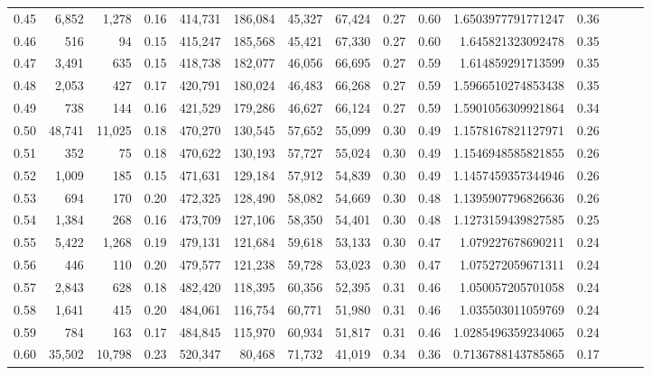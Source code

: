\begin{tabular}{rrrrrrrrrrrrrrr}
0.45 &   6,852 &   1,278 &  0.16 &  414,731 &  186,084 &   45,327 &   67,424 &  0.27 &  0.60 &    1.6503977791771247 &      0.36 \\
0.46 &     516 &      94 &  0.15 &  415,247 &  185,568 &   45,421 &   67,330 &  0.27 &  0.60 &     1.645821323092478 &      0.35 \\
0.47 &   3,491 &     635 &  0.15 &  418,738 &  182,077 &   46,056 &   66,695 &  0.27 &  0.59 &     1.614859291713599 &      0.35 \\
0.48 &   2,053 &     427 &  0.17 &  420,791 &  180,024 &   46,483 &   66,268 &  0.27 &  0.59 &    1.5966510274853438 &      0.35 \\
0.49 &     738 &     144 &  0.16 &  421,529 &  179,286 &   46,627 &   66,124 &  0.27 &  0.59 &    1.5901056309921864 &      0.34 \\
0.50 &  48,741 &  11,025 &  0.18 &  470,270 &  130,545 &   57,652 &   55,099 &  0.30 &  0.49 &    1.1578167821127971 &      0.26 \\
0.51 &     352 &      75 &  0.18 &  470,622 &  130,193 &   57,727 &   55,024 &  0.30 &  0.49 &    1.1546948585821855 &      0.26 \\
0.52 &   1,009 &     185 &  0.15 &  471,631 &  129,184 &   57,912 &   54,839 &  0.30 &  0.49 &    1.1457459357344946 &      0.26 \\
0.53 &     694 &     170 &  0.20 &  472,325 &  128,490 &   58,082 &   54,669 &  0.30 &  0.48 &    1.1395907796826636 &      0.26 \\
0.54 &   1,384 &     268 &  0.16 &  473,709 &  127,106 &   58,350 &   54,401 &  0.30 &  0.48 &    1.1273159439827585 &      0.25 \\
0.55 &   5,422 &   1,268 &  0.19 &  479,131 &  121,684 &   59,618 &   53,133 &  0.30 &  0.47 &     1.079227678690211 &      0.24 \\
0.56 &     446 &     110 &  0.20 &  479,577 &  121,238 &   59,728 &   53,023 &  0.30 &  0.47 &     1.075272059671311 &      0.24 \\
0.57 &   2,843 &     628 &  0.18 &  482,420 &  118,395 &   60,356 &   52,395 &  0.31 &  0.46 &     1.050057205701058 &      0.24 \\
0.58 &   1,641 &     415 &  0.20 &  484,061 &  116,754 &   60,771 &   51,980 &  0.31 &  0.46 &     1.035503011059769 &      0.24 \\
0.59 &     784 &     163 &  0.17 &  484,845 &  115,970 &   60,934 &   51,817 &  0.31 &  0.46 &    1.0285496359234065 &      0.24 \\
0.60 &  35,502 &  10,798 &  0.23 &  520,347 &   80,468 &   71,732 &   41,019 &  0.34 &  0.36 &    0.7136788143785865 &      0.17 \\

\end{tabular}

